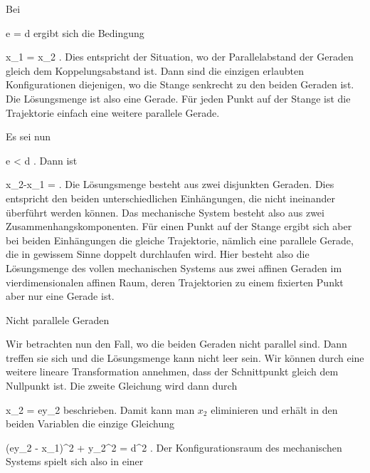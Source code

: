 {Bei

\mavergleichskette
{\vergleichskette
{ e
}
{ = }{ d
}
{  }{
}
{    }{
}
{   }{
}
}
{}{}{}
ergibt sich die Bedingung

\mavergleichskette
{\vergleichskette
{ x_1
}
{ = }{ x_2
}
{  }{
}
{    }{
}
{   }{
}
}
{}{}{.}
Dies entspricht der Situation, wo der Parallelabstand der Geraden gleich dem Koppelungsabstand ist. Dann sind die einzigen erlaubten Konfigurationen diejenigen, wo die Stange senkrecht zu den beiden Geraden ist. Die Lösungsmenge ist also eine Gerade. Für jeden Punkt auf der Stange ist die Trajektorie einfach eine weitere parallele Gerade.

Es sei nun

\mavergleichskette
{\vergleichskette
{ e
}
{ < }{ d
}
{  }{
}
{    }{
}
{   }{
}
}
{}{}{.}
Dann ist

\mavergleichskettedisp
{\vergleichskette
{ x_2-x_1
}
{ =} { \pm {}
}
{ } {
}
{ } {
}
{ } {
}
}
{}{}{.}
Die Lösungsmenge besteht aus zwei disjunkten Geraden. Dies entspricht den beiden unterschiedlichen Einhängungen, die nicht ineinander überführt werden können. Das mechanische System besteht also aus zwei Zusammenhangskomponenten. Für einen Punkt auf der Stange ergibt sich aber bei beiden Einhängungen die gleiche Trajektorie, nämlich eine parallele Gerade, die in gewissem Sinne doppelt durchlaufen wird. Hier besteht also die Lösungsmenge des vollen mechanischen Systems aus zwei
 {} {}
affinen Geraden im vierdimensionalen affinen Raum, deren Trajektorien zu einem fixierten Punkt aber nur eine Gerade ist.



Nicht parallele Geraden

Wir betrachten nun den Fall, wo die beiden Geraden nicht parallel sind. Dann treffen sie sich und die Lösungsmenge kann nicht leer sein. Wir können durch eine weitere lineare Transformation annehmen, dass der Schnittpunkt gleich dem Nullpunkt
 ist. Die zweite Gleichung wird dann durch

\mavergleichskette
{\vergleichskette
{ x_2
}
{ = }{ ey_2
}
{  }{
}
{    }{
}
{   }{
}
}
{}{}{}
beschrieben. Damit kann man $x_2$ eliminieren und erhält in den beiden Variablen
 die einzige Gleichung

\mavergleichskettedisp
{\vergleichskette
{ (ey_2 - x_1)^2 + y_2^2
}
{ =} { d^2
}
{ } {
}
{ } {
}
{ } {
}
}
{}{}{.}
Der Konfigurationsraum des mechanischen Systems spielt sich also in einer
}
